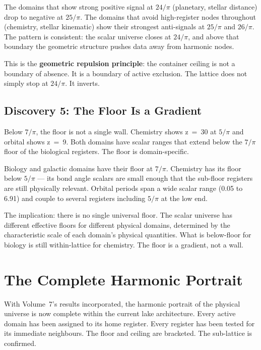 \documentclass[11pt, letterpaper, openany]{book}
\begin{document}
The domains that show strong positive signal at $24/\pi$ (planetary, stellar distance)
drop to negative at $25/\pi$. The domains that avoid high-register nodes throughout
(chemistry, stellar kinematic) show their strongest anti-signals at $25/\pi$ and
$26/\pi$. The pattern is consistent: the scalar universe closes at $24/\pi$, and above
that boundary the geometric structure pushes data away from harmonic nodes.

This is the \textbf{geometric repulsion principle}: the container ceiling is not a
boundary of absence. It is a boundary of active exclusion. The lattice does not simply
stop at $24/\pi$. It inverts.

\section*{Discovery 5: The Floor Is a Gradient}

Below $7/\pi$, the floor is not a single wall. Chemistry shows z~=~30 at $5/\pi$ and
orbital shows z~=~9. Both domains have scalar ranges that extend below the $7/\pi$
floor of the biological registers. The floor is domain-specific.

Biology and galactic domains have their floor at $7/\pi$. Chemistry has its floor
below $5/\pi$ --- its bond angle scalars are small enough that the sub-floor registers
are still physically relevant. Orbital periods span a wide scalar range (0.05 to 6.91)
and couple to several registers including $5/\pi$ at the low end.

The implication: there is no single universal floor. The scalar universe has different
effective floors for different physical domains, determined by the characteristic scale
of each domain's physical quantities. What is below-floor for biology is still
within-lattice for chemistry. The floor is a gradient, not a wall.

\chapter{The Complete Harmonic Portrait}

With Volume~7's results incorporated, the harmonic portrait of the physical universe
is now complete within the current lake architecture. Every active domain has been
assigned to its home register. Every register has been tested for its immediate
neighbours. The floor and ceiling are bracketed. The sub-lattice is confirmed.
\end{document}
